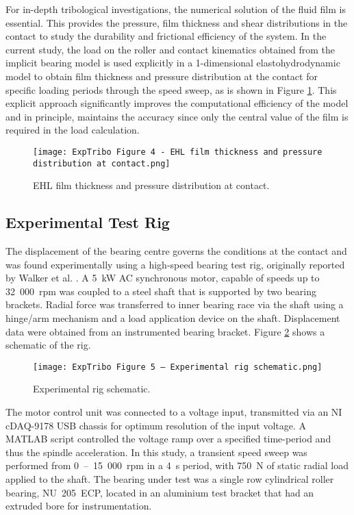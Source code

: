 For in-depth tribological investigations, the numerical solution of the fluid film is essential. This provides the pressure, film thickness and shear distributions in the contact to study the durability and frictional efficiency of the system. In the current study, the load on the roller and contact kinematics obtained from the implicit bearing model is used explicitly in a 1-dimensional elastohydrodynamic model to obtain film thickness and pressure distribution at the contact for specific loading periods through the speed sweep, as is shown in Figure \ref{EHL film thickness and pressure distribution at contact}. This explicit approach significantly improves the computational efficiency of the model and in principle, maintains the accuracy since only the central value of the film is required in the load calculation.

\begin{figure}
	\centering
	\texttt{[image: ExpTribo Figure 4 - EHL film thickness and pressure distribution at contact.png]}
	\caption{EHL film thickness and pressure distribution at contact.}
	\label{EHL film thickness and pressure distribution at contact}
\end{figure}

\subsection{Experimental Test Rig}

The displacement of the bearing centre governs the conditions at the contact and was found experimentally using a high-speed bearing test rig, originally reported by Walker et al. \cite{Walker2018a}. A 5~kW AC synchronous motor, capable of speeds up to 32~000~rpm was coupled to a steel shaft that is supported by two bearing brackets. Radial force was transferred to inner bearing race via the shaft using a hinge/arm mechanism and a load application device on the shaft. Displacement data were obtained from an instrumented bearing bracket. Figure \ref{Experimental rig schematic} shows a schematic of the rig.

\begin{figure}
	\centering
	\texttt{[image: ExpTribo Figure 5 – Experimental rig schematic.png]}
	\caption{Experimental rig schematic.}
	\label{Experimental rig schematic}
\end{figure}

The motor control unit was connected to a voltage input, transmitted via an NI cDAQ-9178 USB chassis for optimum resolution of the input voltage. A MATLAB script controlled the voltage ramp over a specified time-period and thus the spindle acceleration. In this study, a transient speed sweep was performed from 0~–~15~000~rpm in a 4~s period, with 750~N of static radial load applied to the shaft. The bearing under test was a single row cylindrical roller bearing, NU~205~ECP, located in an aluminium test bracket that had an extruded bore for instrumentation.

